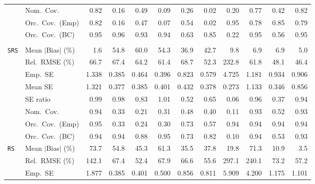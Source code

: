 \begin{landscape}
\begin{longtable}{llrrrrrrrrrr}
 & Nom.\ Cov. & \cellcolor{rankone}0.82 & 0.16 & 0.49 & 0.09 & 0.26 & 0.02 & 0.20 & \cellcolor{rankthree}0.77 & 0.42 & \cellcolor{ranktwo}0.82 \\
 & Orc.\ Cov.\ (Emp) & \cellcolor{rankthree}0.82 & 0.16 & 0.47 & 0.07 & 0.54 & 0.02 & \cellcolor{rankone}0.95 & 0.78 & \cellcolor{ranktwo}0.85 & 0.79 \\
 & Orc.\ Cov.\ (BC) & \cellcolor{ranktwo}0.95 & 0.96 & 0.93 & 0.94 & 0.63 & 0.85 & 0.22 & \cellcolor{rankone}0.95 & 0.56 & \cellcolor{rankthree}0.95 \\
\addlinespace[2pt]
\multicolumn{12}{l}{\textbf{Binary \& Categorical Phase-One Covariates}} \\
\addlinespace[2pt]
\quad \texttt{SRS} & Mean $|$Bias$|$ (\%) & \cellcolor{rankone}1.6 & 54.8 & 60.0 & 54.3 & 36.9 & 42.7 & 9.8 & 6.9 & \cellcolor{rankthree}6.9 & \cellcolor{ranktwo}5.0 \\
 & Rel.\ RMSE (\%) & 66.7 & 67.4 & 64.2 & 61.4 & 68.7 & \cellcolor{rankthree}52.3 & 232.8 & 61.8 & \cellcolor{ranktwo}48.1 & \cellcolor{rankone}46.4 \\
 & Emp.\ SE & 1.338 & 0.385 & 0.464 & 0.396 & 0.823 & 0.579 & 4.725 & 1.181 & 0.934 & 0.906 \\
 & Mean SE & 1.321 & 0.377 & 0.385 & 0.401 & 0.432 & 0.378 & 0.273 & 1.133 & 0.346 & 0.856 \\
 & SE ratio & \cellcolor{ranktwo}0.99 & \cellcolor{rankthree}0.98 & 0.83 & \cellcolor{rankone}1.01 & 0.52 & 0.65 & 0.06 & 0.96 & 0.37 & 0.94 \\
 & Nom.\ Cov. & \cellcolor{rankone}0.94 & 0.33 & 0.21 & 0.31 & 0.48 & 0.40 & 0.11 & \cellcolor{rankthree}0.93 & 0.52 & \cellcolor{ranktwo}0.93 \\
 & Orc.\ Cov.\ (Emp) & \cellcolor{rankone}0.95 & 0.33 & 0.24 & 0.30 & 0.73 & 0.57 & \cellcolor{ranktwo}0.94 & 0.94 & 0.94 & \cellcolor{rankthree}0.94 \\
 & Orc.\ Cov.\ (BC) & \cellcolor{ranktwo}0.94 & \cellcolor{rankthree}0.94 & 0.88 & \cellcolor{rankone}0.95 & 0.73 & 0.82 & 0.10 & 0.94 & 0.53 & 0.93 \\
\addlinespace[2pt]
\quad \texttt{RS} & Mean $|$Bias$|$ (\%) & 73.7 & 54.8 & 45.3 & 61.3 & 35.5 & 37.8 & \cellcolor{rankthree}19.8 & 71.3 & \cellcolor{ranktwo}10.9 & \cellcolor{rankone}3.5 \\
 & Rel.\ RMSE (\%) & 142.1 & 67.4 & \cellcolor{rankone}52.4 & 67.9 & 66.6 & \cellcolor{ranktwo}55.6 & 297.1 & 240.1 & 73.2 & \cellcolor{rankthree}57.2 \\
 & Emp.\ SE & 1.877 & 0.385 & 0.401 & 0.500 & 0.856 & 0.811 & 5.909 & 4.200 & 1.175 & 1.101 \\

\end{longtable}
\end{landscape}
